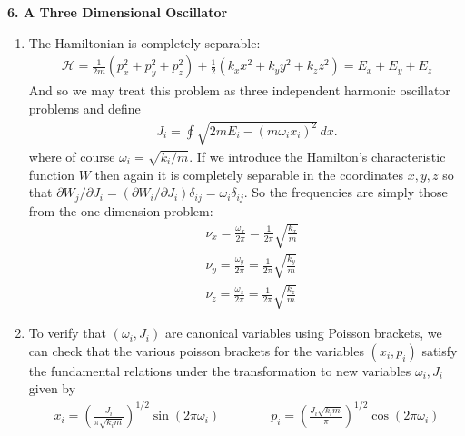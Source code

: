 \documentclass{article}
\theoremstyle{definition}
\newcommand{\p}{\partial}
\newcommand{\ham}{\mathcal{H}}
\newcommand{\f}[2]{\frac{#1}{#2}}
\newcommand{\lp}{\left(}
\newcommand{\rp}{\right)}
\begin{document}
\noindent \textbf{6. A Three Dimensional Oscillator}

\begin{enumerate}[label=(\alph*)]
	\item The Hamiltonian is completely separable:
	\begin{align*}
	\ham = \f{1}{2m}(p_x^2 + p_y^2 + p_z^2) + \f{1}{2}(k_xx^2 + k_y y^2 + k_z z^2) = E_x + E_y + E_z
	\end{align*}
	And so we may treat this problem as three independent harmonic oscillator problems and define 
	\begin{align*}
	J_i = \oint \sqrt{2mE_i - (m\omega_i x_i)^2}\,dx.
	\end{align*}
	where of course $\omega_i = \sqrt{k_i/m}$. If we introduce the Hamilton's characteristic function $W$ then again it is completely separable in the coordinates $x,y,z$ so that $\p W_j/\p J_i = (\p W_i/\p J_i) \delta_{ij} = \omega_i \delta_{ij}$. So the frequencies are simply those from the one-dimension problem:
	\begin{align*}
	&\nu_x =  \f{\omega_x}{2\pi} = \f{1}{2\pi}\sqrt{\f{k_x}{m}}\\
	&\nu_y =  \f{\omega_y}{2\pi} = \f{1}{2\pi}\sqrt{\f{k_y}{m}}\\
	&\nu_z =  \f{\omega_z}{2\pi} = \f{1}{2\pi}\sqrt{\f{k_z}{m}}
	\end{align*} 
	
	
	\item To verify that $(\omega_i,J_i)$ are canonical variables using Poisson brackets, we can check that the various poisson brackets for the variables $(x_i,p_i)$ satisfy the fundamental relations under the transformation to new variables $\omega_i,J_i$ given by 
	\begin{align*}
	x_i = \lp \f{J_i}{\pi \sqrt{k_im }}\rp^{1/2}\sin(2\pi \omega_i) \quad\quad\quad\quad 
	p_i = \lp \f{J_i\sqrt{k_im}}{\pi} \rp^{1/2} \cos (2\pi \omega_i) 
	\end{align*}
	
	
	

\end{enumerate}
\end{document}
